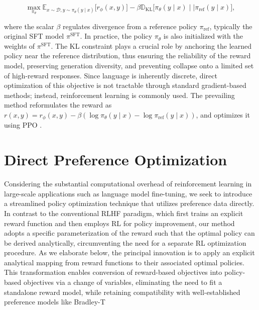 \begin{equation}\label{eq:RL}
\max_{\pi_{\theta}}  \mathbb{E}_{x\sim \mathcal{D}, y\sim \pi_{\theta}(y \mid x)}\bigl[r_{\phi}(x, y)\bigr] - \beta\mathbb{D}_{\textrm{KL}}\bigl[\pi_{\theta}(y\mid x)\mid \mid \pi_\text{ref}(y\mid x)\bigr],
\end{equation}

where the scalar $\beta$ regulates divergence from a reference policy $\pi_\text{ref}$, typically the original SFT model $\pi^\text{SFT}$. In practice, the policy $\pi_\theta$ is also initialized with the weights of $\pi^\text{SFT}$. The KL constraint plays a crucial role by anchoring the learned policy near the reference distribution, thus ensuring the reliability of the reward model, preserving generation diversity, and preventing collapse onto a limited set of high-reward responses. Since language is inherently discrete, direct optimization of this objective is not tractable through standard gradient-based methods; instead, reinforcement learning is commonly used. The prevailing method \citep{ziegler2020finetuning, stiennon2022learning, bai2022training, ouyang2022training} reformulates the reward as ${r(x, y) = r_{\phi}(x, y) -\beta (\log \pi_{\theta}(y\mid x) - \log \pi_\text{ref}(y\mid x))}$, and optimizes it using PPO \cite{schulman2017proximal}. 

\section{Direct Preference Optimization}\label{sec:DPO}

Considering the substantial computational overhead of reinforcement learning in large-scale applications such as language model fine-tuning, we seek to introduce a streamlined policy optimization technique that utilizes preference data directly. In contrast to the conventional RLHF paradigm, which first trains an explicit reward function and then employs RL for policy improvement, our method adopts a specific parameterization of the reward such that the optimal policy can be derived analytically, circumventing the need for a separate RL optimization procedure. As we elaborate below, the principal innovation is to apply an explicit analytical mapping from reward functions to their associated optimal policies. This transformation enables conversion of reward-based objectives into policy-based objectives via a change of variables, eliminating the need to fit a standalone reward model, while retaining compatibility with well-established preference models like Bradley-T

